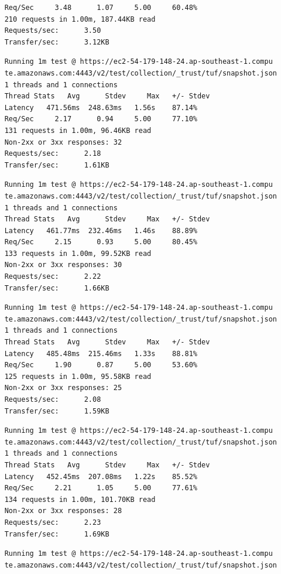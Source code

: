 \documentclass[a4paper,12pt]{article}
\newcounter{subsubsubsection}[subsubsection]
\begin{document}
{{\begin{verbatim}
	Req/Sec     3.48      1.07     5.00     60.48%
	210 requests in 1.00m, 187.44KB read
	Requests/sec:      3.50
	Transfer/sec:      3.12KB
	\end{verbatim}
	\newpage
	\begin{verbatim}
	Running 1m test @ https://ec2-54-179-148-24.ap-southeast-1.compu
	te.amazonaws.com:4443/v2/test/collection/_trust/tuf/snapshot.json
	1 threads and 1 connections
	Thread Stats   Avg      Stdev     Max   +/- Stdev
	Latency   471.56ms  248.63ms   1.56s    87.14%
	Req/Sec     2.17      0.94     5.00     77.10%
	131 requests in 1.00m, 96.46KB read
	Non-2xx or 3xx responses: 32
	Requests/sec:      2.18
	Transfer/sec:      1.61KB
	\end{verbatim}
	\begin{verbatim}
	Running 1m test @ https://ec2-54-179-148-24.ap-southeast-1.compu
	te.amazonaws.com:4443/v2/test/collection/_trust/tuf/snapshot.json
	1 threads and 1 connections
	Thread Stats   Avg      Stdev     Max   +/- Stdev
	Latency   461.77ms  232.46ms   1.46s    88.89%
	Req/Sec     2.15      0.93     5.00     80.45%
	133 requests in 1.00m, 99.52KB read
	Non-2xx or 3xx responses: 30
	Requests/sec:      2.22
	Transfer/sec:      1.66KB
	\end{verbatim}
	\begin{verbatim}
	Running 1m test @ https://ec2-54-179-148-24.ap-southeast-1.compu
	te.amazonaws.com:4443/v2/test/collection/_trust/tuf/snapshot.json
	1 threads and 1 connections
	Thread Stats   Avg      Stdev     Max   +/- Stdev
	Latency   485.48ms  215.46ms   1.33s    88.81%
	Req/Sec     1.90      0.87     5.00     53.60%
	125 requests in 1.00m, 95.58KB read
	Non-2xx or 3xx responses: 25
	Requests/sec:      2.08
	Transfer/sec:      1.59KB
	\end{verbatim}
	\begin{verbatim}
	Running 1m test @ https://ec2-54-179-148-24.ap-southeast-1.compu
	te.amazonaws.com:4443/v2/test/collection/_trust/tuf/snapshot.json
	1 threads and 1 connections
	Thread Stats   Avg      Stdev     Max   +/- Stdev
	Latency   452.45ms  207.08ms   1.22s    85.52%
	Req/Sec     2.21      1.05     5.00     77.61%
	134 requests in 1.00m, 101.70KB read
	Non-2xx or 3xx responses: 28
	Requests/sec:      2.23
	Transfer/sec:      1.69KB
	\end{verbatim}
	\newpage
	\begin{verbatim}
	Running 1m test @ https://ec2-54-179-148-24.ap-southeast-1.compu
	te.amazonaws.com:4443/v2/test/collection/_trust/tuf/snapshot.json

\end{verbatim}}}
\end{document}

